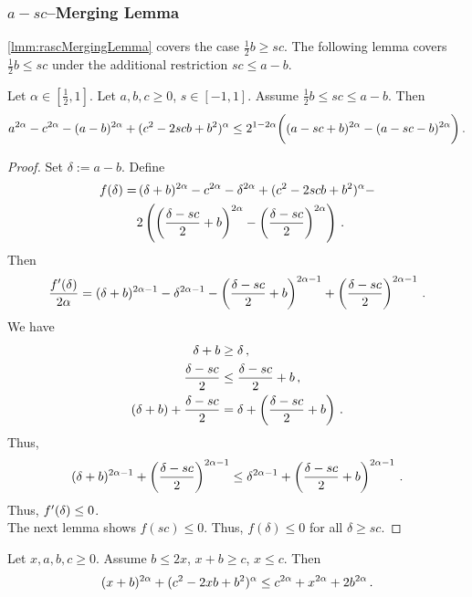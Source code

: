 \subsubsection{$a-sc$--Merging Lemma}
%
\autoref{lmm:rascMergingLemma} covers the case $\frac12 b \geq sc$.
The following lemma covers  $\frac12 b \leq sc$  under the additional restriction $sc \leq a-b$.
%
\begin{lemma}\label{lmm:merging:asc}
	Let $\alpha\in[\frac12,1]$.
	Let $a,b,c\geq0$, $s\in[-1,1]$.
	Assume $\frac12 b \leq sc\leq a-b$.
	Then
	\begin{equation*}
		a^{2\alpha}-c^{2\alpha}-(a-b)^{2\alpha}+(c^2 - 2 s c b + b^2)^\alpha \leq 2^{1-2\alpha} \bigg(
			(a - s c + b)^{2\alpha}  -  (a - s c - b)^{2\alpha}
		\bigg)
		\, .
	\end{equation*}
\end{lemma}
%
\begin{proof}
	Set $\delta:=a-b$.
	Define
	\begin{align*}
		f(\delta) 
		= &\,(\delta+b)^{2\alpha}-c^{2\alpha}-\delta^{2\alpha}+(c^2 - 2 s c b + b^2)^\alpha -
		\\&2 \left( 
					\left( \frac{\delta - s c}{2} + b \right)^{2\alpha}  -  \left( \frac{\delta - s c}{2} \right)^{2\alpha}
				 \right)
		\, .
	\end{align*}
	Then
	\begin{equation*}
		\frac{f^\prime(\delta)}{2\alpha} =
		(\delta+b)^{2\alpha-1}-\delta^{2\alpha-1} 
		- \left( \frac{\delta - s c}{2} + b \right)^{2\alpha-1}
		+ \left( \frac{\delta - s c}{2} \right)^{2\alpha-1}
		\, .
	\end{equation*}
	We have
	\begin{align*}
		\delta+b &\geq  \delta\, ,\\
		\frac{\delta - s c}{2} &\leq  \frac{\delta - s c}{2} + b\, ,\\
		(\delta+b) + \frac{\delta - s c}{2} &= \delta +\left( \frac{\delta - s c}{2} + b \right)\, .
	\end{align*}
	Thus,
	\begin{equation*}
		(\delta+b)^{2\alpha-1}
		+ \left( \frac{\delta - s c}{2} \right)^{2\alpha-1}
		\leq
		\delta^{2\alpha-1} 
		+\left( \frac{\delta - s c}{2} + b \right)^{2\alpha-1}
		\, .
	\end{equation*}
	Thus, $f^\prime(\delta) \leq 0$.\\ 
	The next lemma shows $f(sc) \leq 0$. Thus, $f(\delta) \leq 0$ for all $\delta \geq sc$.
\end{proof}
%
\begin{lemma}
	Let $x,a,b,c \geq 0$.
	Assume $b \leq 2x$, $x+b \geq c$, $x\leq c$.
	Then
	\begin{equation*}
		(x+b)^{2\alpha}+(c^2 - 2 x b + b^2)^\alpha \leq c^{2\alpha}+x^{2\alpha} + 2 b^{2\alpha} 
		\, .
	\end{equation*}	
\end{lemma}
